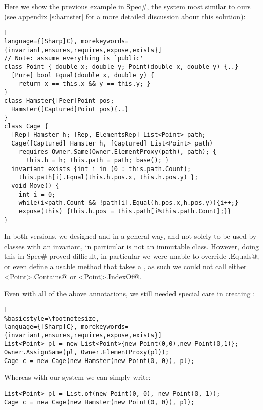  Here we show the previous example in Spec\#, the system most similar to ours (see appendix \ref{s:hamster} for a more detailed discussion about this solution):
\begin{lstlisting}[
language={[Sharp]C}, morekeywords={invariant,ensures,requires,expose,exists}]
// Note: assume everything is `public'
class Point { double x; double y; Point(double x, double y) {..}
  [Pure] bool Equal(double x, double y) {
    return x == this.x && y == this.y; }
}
class Hamster{[Peer]Point pos; 
  Hamster([Captured]Point pos){..}
}
class Cage {
  [Rep] Hamster h; [Rep, ElementsRep] List<Point> path;
  Cage([Captured] Hamster h, [Captured] List<Point> path)
    requires Owner.Same(Owner.ElementProxy(path), path); {
      this.h = h; this.path = path; base(); }
  invariant exists {int i in (0 : this.path.Count);
    this.path[i].Equal(this.h.pos.x, this.h.pos.y) };
  void Move() {
    int i = 0;
    while(i<path.Count && !path[i].Equal(h.pos.x,h.pos.y)){i++;}
    expose(this) {this.h.pos = this.path[i%this.path.Count];}}
}
\end{lstlisting}

In both versions, we designed \Q@Point@ and \Q@Hamster@ in a general way, and not solely to be used by classes with an invariant, in particular \Q@Point@ is not an immutable class. However, doing this in Spec\# proved difficult, in particular we were unable to override \Q@Object.Equals@, or even define a usable \Q@equals@ method that takes a \Q@Point@, as such we could not call either \Q@List<Point>.Contains@ or \Q@List<Point>.IndexOf@.
 
Even with all of the above annotations, we still needed special care in creating \Q@Cage@s:\vspace{-1.860px}%
\begin{lstlisting}[
%basicstyle=\footnotesize,
language={[Sharp]C}, morekeywords={invariant,ensures,requires,expose,exists}]
List<Point> pl = new List<Point>{new Point(0,0),new Point(0,1)};
Owner.AssignSame(pl, Owner.ElementProxy(pl));
Cage c = new Cage(new Hamster(new Point(0, 0)), pl);
\end{lstlisting}

Whereas with our system we can simply write:
\begin{lstlisting}
List<Point> pl = List.of(new Point(0, 0), new Point(0, 1));
Cage c = new Cage(new Hamster(new Point(0, 0)), pl);
\end{lstlisting}

